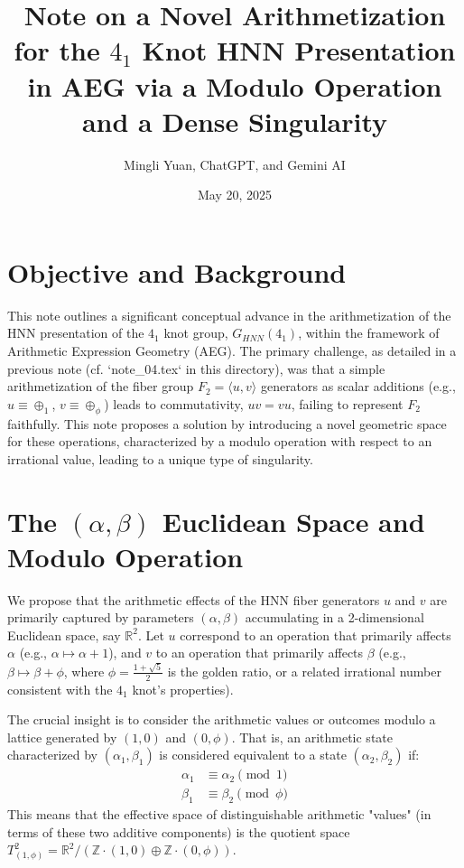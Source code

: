 \documentclass[12pt, a4paper]{article}
\title{Note on a Novel Arithmetization for the $4_1$ Knot HNN Presentation in AEG via a Modulo Operation and a Dense Singularity}
\author{Mingli Yuan, ChatGPT, and Gemini AI} %
\date{May 20, 2025} %
\begin{document}
\maketitle

\section{Objective and Background}
This note outlines a significant conceptual advance in the arithmetization of the HNN presentation of the $4_1$ knot group, $G_{HNN}(4_1)$, within the framework of Arithmetic Expression Geometry (AEG).
The primary challenge, as detailed in a previous note (cf. `note\_04.tex` in this directory), was that a simple arithmetization of the fiber group $F_2 = \langle u, v \rangle$ generators as scalar additions (e.g., $u \equiv \oplus_1$, $v \equiv \oplus_\phi$) leads to commutativity, $uv=vu$, failing to represent $F_2$ faithfully. This note proposes a solution by introducing a novel geometric space for these operations, characterized by a modulo operation with respect to an irrational value, leading to a unique type of singularity.

\section{The $(\alpha, \beta)$ Euclidean Space and Modulo Operation}
We propose that the arithmetic effects of the HNN fiber generators $u$ and $v$ are primarily captured by parameters $(\alpha, \beta)$ accumulating in a 2-dimensional Euclidean space, say $\mathbb{R}^2$.
Let $u$ correspond to an operation that primarily affects $\alpha$ (e.g., $\alpha \mapsto \alpha + 1$), and $v$ to an operation that primarily affects $\beta$ (e.g., $\beta \mapsto \beta + \phi$, where $\phi = \frac{1+\sqrt{5}}{2}$ is the golden ratio, or a related irrational number consistent with the $4_1$ knot's properties).

The crucial insight is to consider the arithmetic values or outcomes modulo a lattice generated by $(1,0)$ and $(0,\phi)$. That is, an arithmetic state characterized by $(\alpha_1, \beta_1)$ is considered equivalent to a state $(\alpha_2, \beta_2)$ if:
\begin{align*}
    \alpha_1 &\equiv \alpha_2 \pmod 1 \\
    \beta_1 &\equiv \beta_2 \pmod \phi
\end{align*}
This means that the effective space of distinguishable arithmetic "values" (in terms of these two additive components) is the quotient space $T^2_{(1,\phi)} = \mathbb{R}^2 / (\mathbb{Z}\cdot(1,0) \oplus \mathbb{Z}\cdot(0,\phi))$.
\end{document}
